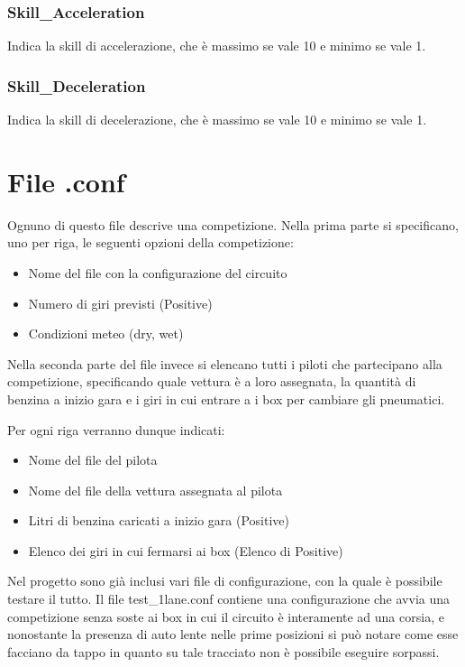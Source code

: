 \documentclass[a4paper,11pt, twoside, openright]{book}
\begin{document}
	\subsubsection{Skill\_Acceleration}
	  Indica la skill di accelerazione, che è massimo se vale 10 e minimo se vale 1.

	\subsubsection{Skill\_Deceleration}
	  Indica la skill di decelerazione, che è massimo se vale 10 e minimo se vale 1.
	  
      \section{File .conf}
	Ognuno di questo file descrive una competizione. Nella prima parte si specificano, uno per riga,
	le seguenti opzioni della competizione:
	
	\begin{itemize}
	  \item Nome del file con la configurazione del circuito
	  \item Numero di giri previsti (Positive)
	  \item Condizioni meteo (dry, wet)
	\end{itemize}
	
	Nella seconda parte del file invece si elencano tutti i piloti che partecipano alla competizione, 
	specificando quale vettura è a loro assegnata, la quantità di benzina a inizio gara e i giri in cui 
	entrare a i box per cambiare gli pneumatici.
	
	Per ogni riga verranno dunque indicati:
	\begin{itemize}
	  \item Nome del file del pilota
	  \item Nome del file della vettura assegnata al pilota
	  \item Litri di benzina caricati a inizio gara (Positive)
	  \item Elenco dei giri in cui fermarsi ai box (Elenco di Positive)
	\end{itemize}

        Nel progetto sono già inclusi vari file di configurazione, con la quale è possibile testare il tutto.
        Il file test\_1lane.conf contiene una configurazione che avvia una competizione senza soste ai box
	in cui il circuito è interamente ad una corsia,
	e nonostante la presenza di auto lente nelle prime posizioni si può notare come esse facciano da tappo
	in quanto su tale tracciato non è possibile eseguire sorpassi.
	
\end{document}

